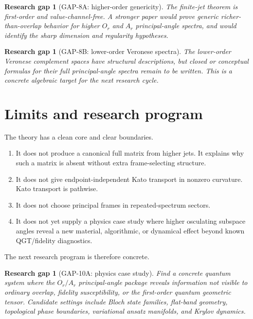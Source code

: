 \documentclass[11pt]{amsart}
\newtheorem{gap}[theorem]{Research gap}
\begin{document}
\begin{gap}[GAP-8A: higher-order genericity]
The finite-jet theorem is first-order and value-channel-free. A stronger paper
would prove generic richer-than-overlap behavior for higher \(O_r\) and \(A_r\)
principal-angle spectra, and would identify the sharp dimension and regularity
hypotheses.
\end{gap}

\begin{gap}[GAP-8B: lower-order Veronese spectra]
The lower-order Veronese complement spaces have structural descriptions, but
closed or conceptual formulas for their full principal-angle spectra remain to
be written. This is a concrete algebraic target for the next research cycle.
\end{gap}

\section{Limits and research program}

The theory has a clean core and clear boundaries.

\begin{enumerate}
\item It does not produce a canonical full matrix from higher jets. It explains
why such a matrix is absent without extra frame-selecting structure.
\item It does not give endpoint-independent Kato transport in nonzero
curvature. Kato transport is pathwise.
\item It does not choose principal frames in repeated-spectrum sectors.
\item It does not yet supply a physics case study where higher osculating
subspace angles reveal a new material, algorithmic, or dynamical effect beyond
known QGT/fidelity diagnostics.
\end{enumerate}

The next research program is therefore concrete.

\begin{gap}[GAP-10A: physics case study]
Find a concrete quantum system where the \(O_r/A_r\) principal-angle package
reveals information not visible to ordinary overlap, fidelity susceptibility,
or the first-order quantum geometric tensor. Candidate settings include Bloch
state families, flat-band geometry, topological phase boundaries, variational
ansatz manifolds, and Krylov dynamics.
\end{gap}
\end{document}
